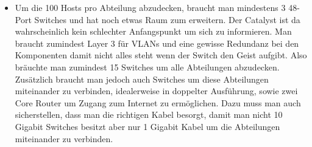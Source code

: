 \documentclass{article}
\begin{document}
\begin{enumerate}
		\begin{itemize}
			\item{Um die 100 Hosts pro Abteilung abzudecken, braucht man mindestens 3 48-Port Switches und hat noch etwas Raum zum erweitern. Der Catalyst ist da wahrscheinlich kein schlechter Anfangspunkt um sich zu informieren. Man braucht zumindest Layer 3 für VLANs und eine gewisse Redundanz bei den Komponenten damit nicht alles steht wenn der Switch den Geist aufgibt. Also bräuchte man zumindest 15 Switches um alle Abteilungen abzudecken. Zusätzlich braucht man jedoch auch Switches um diese Abteilungen miteinander zu verbinden, idealerweise in doppelter Ausführung, sowie zwei Core Router um Zugang zum Internet zu ermöglichen. Dazu muss man auch sicherstellen, dass man die richtigen Kabel besorgt, damit man nicht 10 Gigabit Switches besitzt aber nur 1 Gigabit Kabel um die Abteilungen miteinander zu verbinden.}
		\end{itemize}
	\end{enumerate}
\end{document}

